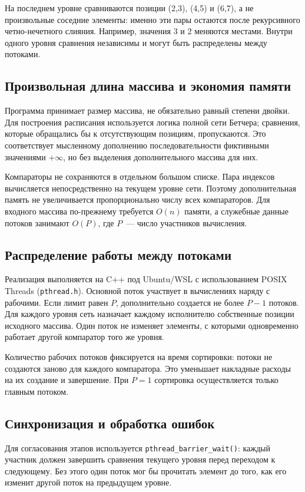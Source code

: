 \documentclass[12pt,a4paper,oneside]{article}
\begin{document}
На последнем уровне сравниваются позиции (2,3), (4,5) и (6,7), а не произвольные соседние элементы: именно эти пары остаются после рекурсивного четно-нечетного слияния. Например, значения 3 и 2 меняются местами. Внутри одного уровня сравнения независимы и могут быть распределены между потоками.

\subsection{Произвольная длина массива и экономия памяти}
Программа принимает размер массива, не обязательно равный степени двойки. Для построения расписания используется логика полной сети Бетчера; сравнения, которые обращались бы к отсутствующим позициям, пропускаются. Это соответствует мысленному дополнению последовательности фиктивными значениями $+\infty$, но без выделения дополнительного массива для них.

Компараторы не сохраняются в отдельном большом списке. Пара индексов вычисляется непосредственно на текущем уровне сети. Поэтому дополнительная память не увеличивается пропорционально числу всех компараторов. Для входного массива по-прежнему требуется $O(n)$ памяти, а служебные данные потоков занимают $O(P)$, где $P$~--- число участников вычисления.

\subsection{Распределение работы между потоками}
Реализация выполняется на C++ под Ubuntu/WSL с использованием POSIX Threads (\texttt{pthread.h}). Основной поток участвует в вычислениях наряду с рабочими. Если лимит равен $P$, дополнительно создается не более $P-1$ потоков. Для каждого уровня сеть назначает каждому исполнителю собственные позиции исходного массива. Один поток не изменяет элементы, с которыми одновременно работает другой компаратор того же уровня.

Количество рабочих потоков фиксируется на время сортировки: потоки не создаются заново для каждого компаратора. Это уменьшает накладные расходы на их создание и завершение. При $P=1$ сортировка осуществляется только главным потоком.

\subsection{Синхронизация и обработка ошибок}
Для согласования этапов используется \texttt{pthread\_barrier\_wait()}: каждый участник должен завершить сравнения текущего уровня перед переходом к следующему. Без этого один поток мог бы прочитать элемент до того, как его изменит другой поток на предыдущем уровне.
\end{document}
